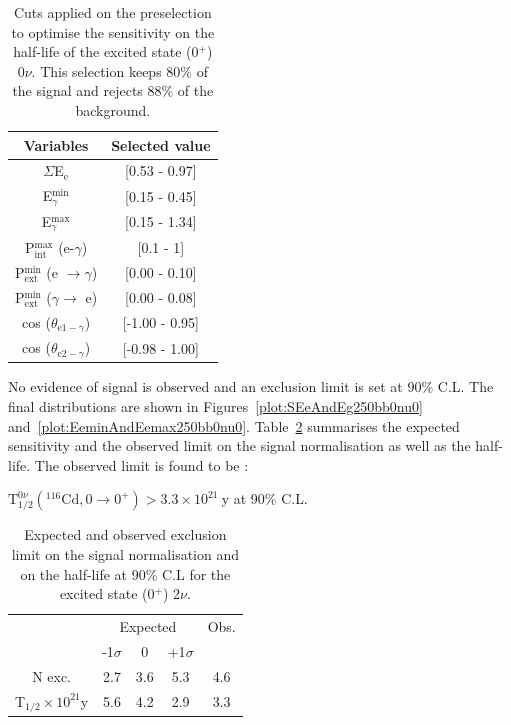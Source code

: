 \documentclass[main.tex]{subfiles}
\begin{document}
\begin{table}[h!]
\centering
\begin{tabular}{c|c}
Variables & Selected value \\
\toprule
$\Sigma$E$_{\text{e}}$ & [0.53 - 0.97] \\
E$_{\gamma}^{\text{min}}$    & [0.15 - 0.45] \\
E$_{\gamma}^{\text{max}}$    & [0.15 - 1.34] \\
P$_{\text{int}}^{\text{max}}$ (e-$\gamma$) & [0.1 - 1] \\
P$_{\text{ext}}^{\text{min}}$ (e $\rightarrow \gamma$) & [0.00 - 0.10] \\
P$_{\text{ext}}^{\text{min}}$ ($\gamma \rightarrow$ e) & [0.00 - 0.08] \\
cos ($\theta_{\text{e1}-\gamma}$) & [-1.00 - 0.95] \\
cos ($\theta_{\text{e2}-\gamma}$) & [-0.98 - 1.00] \\
\bottomrule
\end{tabular}
\caption{Cuts applied on the preselection to optimise the sensitivity on the half-life of the excited state (0$^+$) 0$\nu$. This selection keeps 80\% of the signal and rejects 88\% of the background.}
\label{tab:Cuts0nu0Plus250keV}
\end{table}


\bigskip


\NI No evidence of signal is observed and an exclusion limit is set at 90\% C.L. The final distributions are shown in Figures~\ref{plot:SEeAndEg250bb0nu0} and~\ref{plot:EeminAndEemax250bb0nu0}. Table~\ref{Tab:FinalResultsbb0nu0} summarises the expected sensitivity and the observed limit on the signal normalisation as well as the half-life. The observed limit is found to be :

\begin{center}
$ \text{T}_{\text{1/2}}^{\text{0}\nu} (^{\text{116}} \text{Cd}, \text{0} \rightarrow \text{0}^{+}) > \text{3.3} \times \text{10}^{\text{21}}~\text{y}$ at 90\% C.L.
\end{center}


\begin{table}
\centering
\begin{tabular}{c|c|c|c||c}
 & \multicolumn{3}{c||}{Expected} & Obs. \\
                                                & -1$\sigma$ & 0        & +1$\sigma$ &        \\[0.2cm]
\hline
N exc.                                          & 2.7        & 3.6      & 5.3        & 4.6     \\[0.2cm]
T$_{\text{1/2}} \times \text{10}^{\text{21}}$y  & 5.6        & 4.2      & 2.9        & 3.3      \\[0.2cm]
\hline
\end{tabular}
\caption{Expected and observed exclusion limit on the signal normalisation and on the half-life at 90\% C.L for the excited state (0$^+$) 2$\nu$.}
\label{Tab:FinalResultsbb0nu0}
\end{table}
\end{document}
